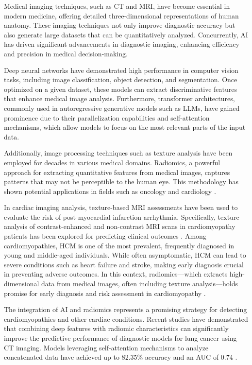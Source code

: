 \documentclass[journal,twoside,web]{ieeecolor}
\begin{document}
Medical imaging techniques, such as \gls{CT} and \gls{MRI}, have become essential in modern medicine, offering detailed three-dimensional representations of human anatomy. These imaging techniques not only improve diagnostic accuracy but also generate large datasets that can be quantitatively analyzed. Concurrently, \gls{AI} has driven significant advancements in diagnostic imaging, enhancing efficiency and precision in medical decision-making.

Deep neural networks have demonstrated high performance in computer vision tasks, including image classification, object detection, and segmentation. Once optimized on a given dataset, these models can extract discriminative features that enhance medical image analysis. Furthermore, transformer architectures, commonly used in autoregressive generative models such as \gls{LLMs}, have gained prominence due to their parallelization capabilities and self-attention mechanisms, which allow models to focus on the most relevant parts of the input data.

Additionally, image processing techniques such as texture analysis have been employed for decades in various medical domains. Radiomics, a powerful approach for extracting quantitative features from medical images, captures patterns that may not be perceptible to the human eye. This methodology has shown potential applications in fields such as oncology and cardiology \cite{mayerhoeferIntroductionRadiomics2020}.

In cardiac imaging analysis, texture-based MRI assessments have been used to evaluate the risk of post-myocardial infarction arrhythmia. Specifically, texture analysis of contrast-enhanced and non-contrast MRI scans in cardiomyopathy patients has been explored for predicting clinical outcomes \cite{schofieldTextureAnalysisCardiovascular2019a}. Among cardiomyopathies, \gls{HCM} is one of the most prevalent, frequently diagnosed in young and middle-aged individuals. While often asymptomatic, \gls{HCM} can lead to severe conditions such as heart failure and stroke, making early diagnosis crucial in preventing adverse outcomes. In this context, radiomics—which extracts high-dimensional data from medical images, often including texture analysis—holds promise for early diagnosis and risk assessment in cardiomyopathy \cite{kwonComparisonMortalityCause2022}.

The integration of AI and radiomics represents a promising strategy for detecting cardiomyopathies and other cardiac conditions. Recent studies have demonstrated that combining deep features with radiomic characteristics can significantly improve the predictive performance of diagnostic models for lung cancer using CT imaging. Models leveraging self-attention mechanisms to analyze concatenated data have achieved up to 82.35\% accuracy and an AUC of 0.74 \cite{lambinRadiomicsExtractingMore2012}.
\end{document}
